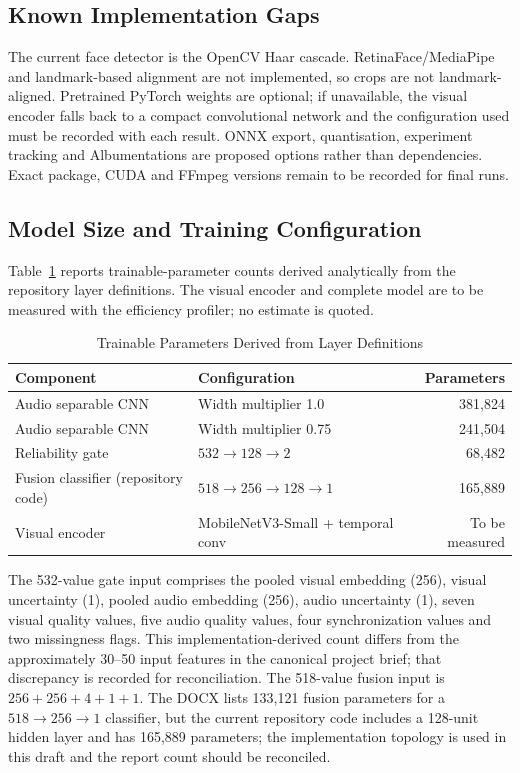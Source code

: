 \documentclass[conference]{IEEEtran}
\begin{document}
\subsection{Known Implementation Gaps}
The current face detector is the OpenCV Haar cascade. RetinaFace/MediaPipe and landmark-based alignment are not implemented, so crops are not landmark-aligned. Pretrained PyTorch weights are optional; if unavailable, the visual encoder falls back to a compact convolutional network and the configuration used must be recorded with each result. ONNX export, quantisation, experiment tracking and Albumentations are proposed options rather than dependencies. Exact package, CUDA and FFmpeg versions remain to be recorded for final runs.

\subsection{Model Size and Training Configuration}
Table~\ref{tab:parameters} reports trainable-parameter counts derived analytically from the repository layer definitions. The visual encoder and complete model are to be measured with the efficiency profiler; no estimate is quoted.

\begin{table}[t]
\caption{Trainable Parameters Derived from Layer Definitions}
\label{tab:parameters}
\centering
\scriptsize
\setlength{\tabcolsep}{3pt}
\begin{tabular}{>{\raggedright\arraybackslash}p{}>{\raggedright\arraybackslash}p{}r}
\toprule
\textbf{Component} & \textbf{Configuration} & \textbf{Parameters} \\
\midrule
Audio separable CNN & Width multiplier 1.0 & 381,824 \\
Audio separable CNN & Width multiplier 0.75 & 241,504 \\
Reliability gate & $532\to128\to2$ & 68,482 \\
Fusion classifier (repository code) & $518\to256\to128\to1$ & 165,889 \\
Visual encoder & MobileNetV3-Small + temporal conv & To be measured \\
\bottomrule
\end{tabular}
\end{table}

The 532-value gate input comprises the pooled visual embedding (256), visual uncertainty (1), pooled audio embedding (256), audio uncertainty (1), seven visual quality values, five audio quality values, four synchronization values and two missingness flags. This implementation-derived count differs from the approximately 30--50 input features in the canonical project brief; that discrepancy is recorded for reconciliation. The 518-value fusion input is $256+256+4+1+1$. The DOCX lists 133,121 fusion parameters for a $518\to256\to1$ classifier, but the current repository code includes a 128-unit hidden layer and has 165,889 parameters; the implementation topology is used in this draft and the report count should be reconciled.
\end{document}
